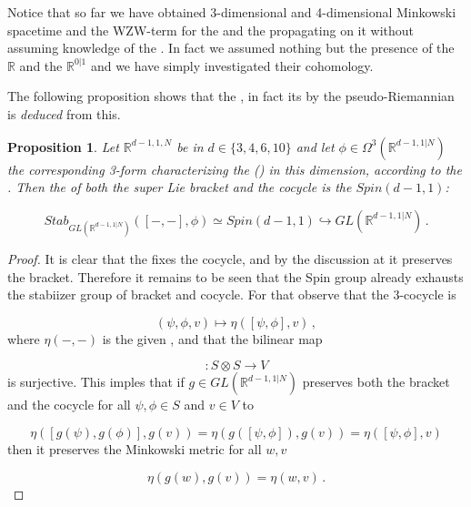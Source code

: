 \documentclass[12pt,titlepage]{article}
\theoremstyle{plain}
\newtheorem{prop}{Proposition}
\theoremstyle{definition}
\theoremstyle{remark}
\begin{document}
Notice that so far we have obtained 3-dimensional and 4-dimensional Minkowski spacetime and the WZW-term for the  and the  propagating on it without assuming knowledge of the . In fact we assumed nothing but the presence of the  $\mathbb{R}$ and the  $\mathbb{R}^{0|1}$ and we have simply investigated their cohomology.

The following proposition shows that the , in fact its  by the pseudo-Riemannian  is \emph{deduced} from this.

\begin{prop}
\label{StabilizerOfSupersymmetryJointWith3Cocycle}\hypertarget{StabilizerOfSupersymmetryJointWith3Cocycle}{}
Let $\mathbb{R}^{d-1,1,N}$ be  in  $d \in \{3,4,6,10\}$ and let $\phi \in \Omega^{3}(\mathbb{R}^{d-1,1|N})$ the corresponding 3-form characterizing the  () in this dimension, according to the  . Then the  of both the super Lie bracket and the cocycle is the  $Spin(d-1,1)$:

\begin{displaymath}
Stab_{GL(\mathbb{R}^{d-1,1|N})}([-,-], \phi)
  \simeq
  Spin(d-1,1) \hookrightarrow GL(\mathbb{R}^{d-1,1|N})
  \,.
\end{displaymath}
\end{prop}
\begin{proof}
It is clear that the  fixes the cocycle, and by the discussion at  it preserves the bracket. Therefore it remains to be seen that the Spin group already exhausts the stabiizer group of bracket and cocycle. For that observe that the 3-cocycle is

\begin{displaymath}
(\psi,\phi, v) \mapsto \eta( [\psi,\phi], v )
  \,,
\end{displaymath}
where $\eta(-,-)$ is the given , and that the bilinear map

\begin{displaymath}
[-,-]\colon S \otimes S\to V
\end{displaymath}
is surjective. This imples that if $g \in GL(\mathbb{R}^{d-1,1|N})$ preserves both the bracket and the cocycle for all $\psi, \phi \in S$ and $v \in V$ to

\begin{displaymath}
\eta( [g(\psi),g(\phi)], g(v) )
  =
  \eta( g([\psi,\phi]), g(v) )
  =
  \eta( [\psi,\phi], v )
\end{displaymath}
then it preserves the Minkowski metric for all $w,v$

\begin{displaymath}
\eta(g(w), g(v)) = \eta(w,v)
  \,.
\end{displaymath}
\end{proof}
\end{document}
